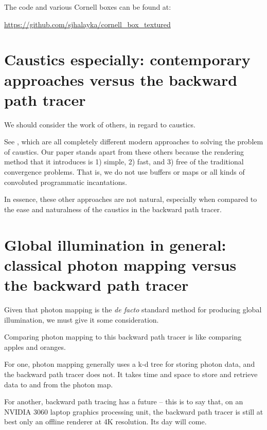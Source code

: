 \documentclass[12pt]{article}
\begin{document}
The code and various Cornell boxes can be found at:

\url{https://github.com/sjhalayka/cornell_box_textured}







\begin{appendix}







\section{Caustics especially: contemporary approaches versus the backward path tracer}

We should consider the work of others, in regard to caustics.

See \cite{moreau, komarov, gruen, yang}, which are all completely different modern approaches to solving the problem of caustics.
Our paper stands apart from these others because the rendering method that it introduces is 1) simple, 2) fast, and 3) free of the traditional convergence problems.
That is, we do not use buffers or maps or all kinds of convoluted programmatic incantations.

In essence, these other approaches are not natural, especially when compared to the ease and naturalness of the caustics in the backward path tracer.





\section{Global illumination in general: classical photon mapping versus the backward path tracer}

Given that photon mapping \cite{jensen, john} is the \textit{de facto} standard method for producing global illumination, we must give it some consideration.

Comparing photon mapping to this backward path tracer is like comparing apples and oranges.

For one, photon mapping generally uses a k-d tree for storing photon data, and the backward path tracer does not.
It takes time and space to store and retrieve data to and from the photon map.

For another, backward path tracing has a future -- this is to say that, on an NVIDIA 3060 laptop graphics processing unit, the backward path tracer is still at best only an offline renderer at 4K resolution.
Its day will come.


\end{appendix}
\end{document}
